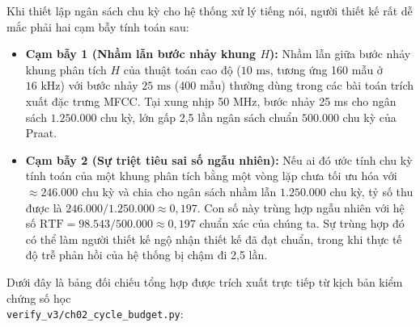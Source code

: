 \begin{tcolorbox}[colback=red!4!white, colframe=red!70!black, title=\textbf{Cạm bẫy thường gặp: Nhầm lẫn bước nhảy khung 10 ms và sự triệt tiêu sai số ngẫu nhiên}]
Khi thiết lập ngân sách chu kỳ cho hệ thống xử lý tiếng nói, người thiết kế rất dễ mắc phải hai cạm bẫy tính toán sau:
\begin{itemize}[leftmargin=1.2em, itemsep=2pt]
    \item \textbf{Cạm bẫy 1 (Nhầm lẫn bước nhảy khung $H$):} Nhầm lẫn giữa bước nhảy khung phân tích $H$ của thuật toán cao độ ($10\text{ ms}$, tương ứng 160 mẫu ở $16\text{ kHz}$) với bước nhảy $25\text{ ms}$ (400 mẫu) thường dùng trong các bài toán trích xuất đặc trưng MFCC. Tại xung nhịp 50 MHz, bước nhảy 25 ms cho ngân sách $1.250.000$ chu kỳ, lớn gấp 2,5 lần ngân sách chuẩn $500.000$ chu kỳ của Praat.
    \item \textbf{Cạm bẫy 2 (Sự triệt tiêu sai số ngẫu nhiên):} Nếu ai đó ước tính chu kỳ tính toán của một khung phân tích bằng một vòng lặp chưa tối ưu hóa với $\approx 246.000$ chu kỳ và chia cho ngân sách nhầm lẫn $1.250.000$ chu kỳ, tỷ số thu được là $246.000 / 1.250.000 \approx 0{,}197$. Con số này trùng hợp ngẫu nhiên với hệ số $\text{RTF} = 98.543 / 500.000 \approx 0{,}197$ chuẩn xác của chúng ta. Sự trùng hợp đó có thể làm người thiết kế ngộ nhận thiết kế đã đạt chuẩn, trong khi thực tế độ trễ phản hồi của hệ thống bị chậm đi 2,5 lần.
\end{itemize}
\end{tcolorbox}

Dưới đây là bảng đối chiếu tổng hợp được trích xuất trực tiếp từ kịch bản kiểm chứng số học\\ \texttt{verify\_v3/ch02\_cycle\_budget.py}:

